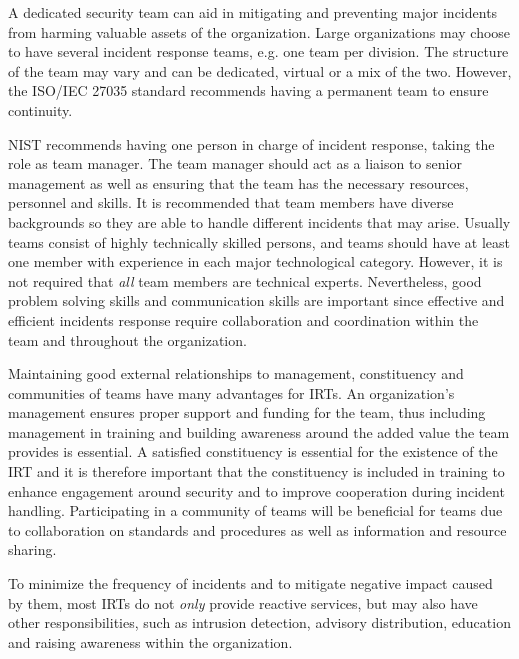 A dedicated security team can aid in mitigating and preventing major incidents from harming valuable assets of the organization. Large organizations may choose to have several incident response teams, e.g. one team per division. The structure of the team may vary and can be dedicated, virtual or a mix of the two. However, the ISO/IEC 27035 standard recommends having a permanent team to ensure continuity. 


\ac{NIST} recommends having one person in charge of incident response, taking the role as team manager. The team manager should act as a liaison to senior management as well as ensuring that the team has the necessary resources, personnel and skills. It is recommended that team members have diverse backgrounds so they are able to handle different incidents that may arise. Usually teams consist of highly technically skilled persons, and teams should have at least one member with experience in each major technological category. However, it is not required that \emph{all} team members are technical experts. Nevertheless, good problem solving skills and communication skills are important since effective and efficient incidents response require collaboration and coordination within the team and throughout the organization.

Maintaining good external relationships to management, constituency and communities of teams have many advantages for \acp{IRT}. An organization's management ensures proper support and funding for the team, thus including management in training and building awareness around the added value the team provides is essential. A satisfied constituency is essential for the existence of the \ac{IRT} and it is therefore important that the constituency is included in training to enhance engagement around security and to improve cooperation during incident handling. Participating in a community of teams will be beneficial for teams due to collaboration on standards and procedures as well as information and resource sharing. 

To minimize the frequency of incidents and to mitigate negative impact caused by them, most \acp{IRT} do not \emph{only} provide reactive services, but may also have other responsibilities, such as intrusion detection, advisory distribution, education and raising awareness within the organization\cite{nist800-61}. 
 

